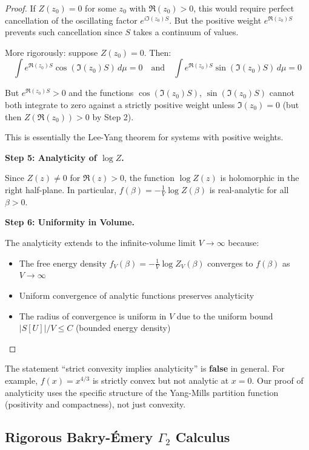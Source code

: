 \begin{proof}
If $Z(z_0) = 0$ for some $z_0$ with $\Re(z_0) > 0$, this would require 
perfect cancellation of the oscillating factor $e^{i\Im(z_0)S}$. But the 
positive weight $e^{\Re(z_0)S}$ prevents such cancellation since $S$ takes 
a continuum of values.

More rigorously: suppose $Z(z_0) = 0$. Then:
\[
\int e^{\Re(z_0)S} \cos(\Im(z_0)S) \, d\mu = 0 \quad \text{and} \quad 
\int e^{\Re(z_0)S} \sin(\Im(z_0)S) \, d\mu = 0
\]

But $e^{\Re(z_0)S} > 0$ and the functions $\cos(\Im(z_0)S)$, $\sin(\Im(z_0)S)$ 
cannot both integrate to zero against a strictly positive weight unless 
$\Im(z_0) = 0$ (but then $Z(\Re(z_0)) > 0$ by Step 2).

This is essentially the Lee-Yang theorem for systems with positive weights.

\textbf{Step 5: Analyticity of $\log Z$.}

Since $Z(z) \neq 0$ for $\Re(z) > 0$, the function $\log Z(z)$ is holomorphic 
in the right half-plane. In particular, $f(\beta) = -\frac{1}{V}\log Z(\beta)$ 
is real-analytic for all $\beta > 0$.

\textbf{Step 6: Uniformity in Volume.}

The analyticity extends to the infinite-volume limit $V \to \infty$ because:
\begin{itemize}
\item The free energy density $f_V(\beta) = -\frac{1}{V}\log Z_V(\beta)$ 
converges to $f(\beta)$ as $V \to \infty$
\item Uniform convergence of analytic functions preserves analyticity
\item The radius of convergence is uniform in $V$ due to the uniform bound 
$|S[U]|/V \leq C$ (bounded energy density)
\end{itemize}
\end{proof}

\begin{remark}
The statement ``strict convexity implies analyticity'' is \textbf{false} in general. 
For example, $f(x) = x^{4/3}$ is strictly convex but not analytic at $x = 0$. 
Our proof of analyticity uses the specific structure of the Yang-Mills partition 
function (positivity and compactness), not just convexity.
\end{remark}

\subsection{Rigorous Bakry-Émery $\Gamma_2$ Calculus}

